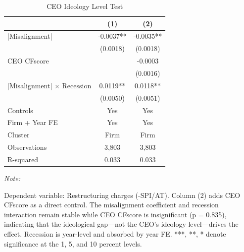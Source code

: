 \documentclass[
  10pt,
]{article}
\begin{document}
\begin{table}[!h]
\centering
\caption{\label{tab:table6}CEO Ideology Level Test}
\centering
\fontsize{9}{11}\selectfont
\begin{threeparttable}
\begin{tabular}[t]{lcc}
\toprule
 & (1) & (2)\\
\midrule
|Misalignment| & -0.0037** & -0.0035**\\
 & (0.0018) & (0.0018)\\
CEO CFscore &  & -0.0003\\
 &  & (0.0016)\\
|Misalignment| × Recession & 0.0119** & 0.0118**\\
\addlinespace
 & (0.0050) & (0.0051)\\
\midrule
Controls & Yes & Yes\\
Firm + Year FE & Yes & Yes\\
Cluster & Firm & Firm\\
Observations & 3,803 & 3,803\\
\addlinespace
R-squared & 0.033 & 0.033\\
\bottomrule
\end{tabular}
\begin{tablenotes}[para]
\item \textit{Note: } 
\item Dependent variable: Restructuring charges (-SPI/AT). Column (2) adds CEO CFscore as a direct control. The misalignment coefficient and recession interaction remain stable while CEO CFscore is insignificant (p = 0.835), indicating that the ideological gap---not the CEO's ideology level---drives the effect. Recession is year-level and absorbed by year FE. ***, **, * denote significance at the 1, 5, and 10 percent levels.
\end{tablenotes}
\end{threeparttable}
\end{table}

\newpage
\end{document}
